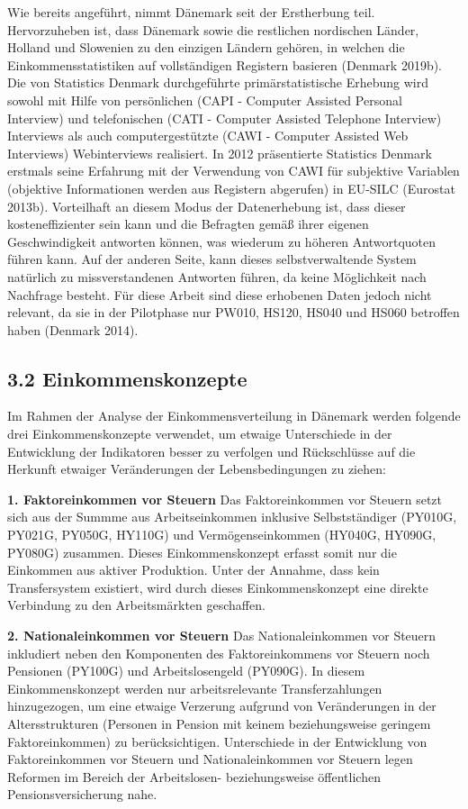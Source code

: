 \documentclass[ngerman,]{article}
\begin{document}
Wie bereits angeführt, nimmt Dänemark seit der Erstherbung teil.
Hervorzuheben ist, dass Dänemark sowie die restlichen nordischen Länder,
Holland und Slowenien zu den einzigen Ländern gehören, in welchen die
Einkommensstatistiken auf vollständigen Registern basieren (Denmark
2019b). Die von Statistics Denmark durchgeführte primärstatistische
Erhebung wird sowohl mit Hilfe von persönlichen (CAPI - Computer
Assisted Personal Interview) und telefonischen (CATI - Computer Assisted
Telephone Interview) Interviews als auch computergestützte (CAWI -
Computer Assisted Web Interviews) Webinterviews realisiert. In 2012
präsentierte Statistics Denmark erstmals seine Erfahrung mit der
Verwendung von CAWI für subjektive Variablen (objektive Informationen
werden aus Registern abgerufen) in EU-SILC (Eurostat 2013b). Vorteilhaft
an diesem Modus der Datenerhebung ist, dass dieser kosteneffizienter
sein kann und die Befragten gemäß ihrer eigenen Geschwindigkeit
antworten können, was wiederum zu höheren Antwortquoten führen kann. Auf
der anderen Seite, kann dieses selbstverwaltende System natürlich zu
missverstandenen Antworten führen, da keine Möglichkeit nach Nachfrage
besteht. Für diese Arbeit sind diese erhobenen Daten jedoch nicht
relevant, da sie in der Pilotphase nur PW010, HS120, HS040 und HS060
betroffen haben (Denmark 2014).

\subsection{3.2 Einkommenskonzepte}\label{einkommenskonzepte}

Im Rahmen der Analyse der Einkommensverteilung in Dänemark werden
folgende drei Einkommenskonzepte verwendet, um etwaige Unterschiede in
der Entwicklung der Indikatoren besser zu verfolgen und Rückschlüsse auf
die Herkunft etwaiger Veränderungen der Lebensbedingungen zu ziehen:

\textbf{1. Faktoreinkommen vor Steuern} Das Faktoreinkommen vor Steuern
setzt sich aus der Summme aus Arbeitseinkommen inklusive Selbstständiger
(PY010G, PY021G, PY050G, HY110G) und Vermögenseinkommen (HY040G, HY090G,
PY080G) zusammen. Dieses Einkommenskonzept erfasst somit nur die
Einkommen aus aktiver Produktion. Unter der Annahme, dass kein
Transfersystem existiert, wird durch dieses Einkommenskonzept eine
direkte Verbindung zu den Arbeitsmärkten geschaffen.

\textbf{2. Nationaleinkommen vor Steuern} Das Nationaleinkommen vor
Steuern inkludiert neben den Komponenten des Faktoreinkommens vor
Steuern noch Pensionen (PY100G) und Arbeitslosengeld (PY090G). In diesem
Einkommenskonzept werden nur arbeitsrelevante Transferzahlungen
hinzugezogen, um eine etwaige Verzerung aufgrund von Veränderungen in
der Altersstrukturen (Personen in Pension mit keinem beziehungsweise
geringem Faktoreinkommen) zu berücksichtigen. Unterschiede in der
Entwicklung von Faktoreinkommen vor Steuern und Nationaleinkommen vor
Steuern legen Reformen im Bereich der Arbeitslosen- beziehungsweise
öffentlichen Pensionsversicherung nahe.
\end{document}
